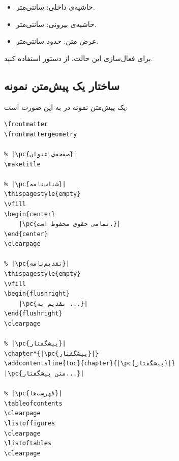 \begin{itemize}
    \item حاشیه‌ی داخلی:  سانتی‌متر.
    \item حاشیه‌ی بیرونی:  سانتی‌متر.
    \item عرض متن: حدود  سانتی‌متر.
\end{itemize}

برای فعال‌سازی این حالت، از دستور
 استفاده کنید.


\subsection{ساختار یک پیش‌متن نمونه}
\label{sec:book-structure-frontmatter-example}

یک پیش‌متن نمونه در  به این صورت است:

\begin{latin}
\begin{verbatim}
\frontmatter
\frontmattergeometry

% |\pc{صفحه‌ی عنوان}|
\maketitle

% |\pc{شناسنامه}|
\thispagestyle{empty}
\vfill
\begin{center}
    |\pc{تمامی حقوق محفوظ است.}|
\end{center}
\clearpage

% |\pc{تقدیم‌نامه}|
\thispagestyle{empty}
\vfill
\begin{flushright}
    |\pc{تقدیم به ...}|
\end{flushright}
\clearpage

% |\pc{پیشگفتار}|
\chapter*{|\pc{پیشگفتار}|}
\addcontentsline{toc}{chapter}{|\pc{پیشگفتار}|}
|\pc{متن پیشگفتار...}|

% |\pc{فهرست‌ها}|
\tableofcontents
\clearpage
\listoffigures
\clearpage
\listoftables
\clearpage
\end{verbatim}
\end{latin}



